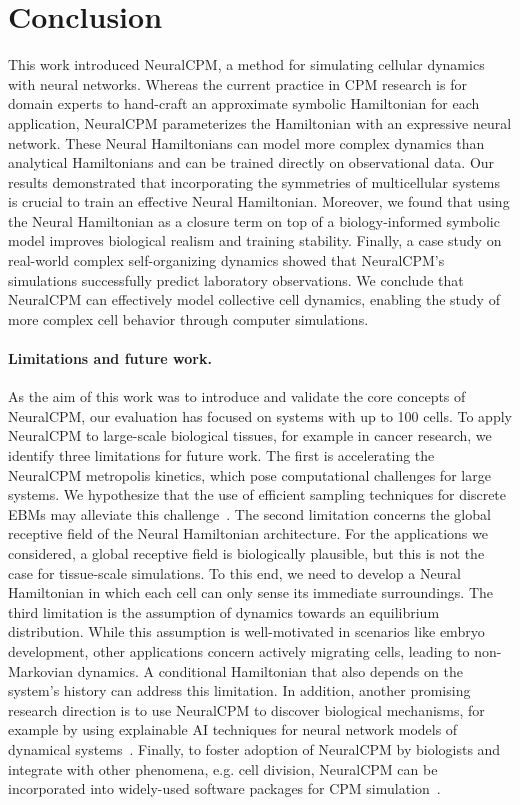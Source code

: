 \section{Conclusion}\label{sec:conclusion}

This work introduced NeuralCPM, a method for simulating cellular dynamics with neural networks. Whereas the current practice in CPM research is for domain experts to hand-craft an approximate symbolic Hamiltonian for each application, NeuralCPM parameterizes the Hamiltonian with an expressive neural network. These Neural Hamiltonians can model more complex dynamics than analytical Hamiltonians and can be trained directly on observational data. Our results demonstrated that incorporating the symmetries of multicellular systems is crucial to train an effective Neural Hamiltonian. Moreover, we found that using the Neural Hamiltonian as a closure term on top of a biology-informed symbolic model improves biological realism and training stability. Finally, a case study on real-world complex self-organizing dynamics showed that NeuralCPM's simulations successfully predict laboratory observations. We conclude that NeuralCPM can effectively model collective cell dynamics, enabling the study of more complex cell behavior through computer simulations.
\paragraph{Limitations and future work.}
As the aim of this work was to introduce and validate the core concepts of NeuralCPM, our evaluation has focused on systems with up to 100 cells. To apply NeuralCPM to large-scale biological tissues, for example in cancer research, we identify three limitations for future work. 
The first is accelerating the NeuralCPM metropolis kinetics, which pose computational challenges for large systems. We hypothesize that the use of efficient sampling techniques for discrete EBMs may alleviate this challenge~\cite{grathwohl2021oops, zhang2022langevin, sun2023discrete}.
The second limitation concerns the global receptive field of the Neural Hamiltonian architecture. For the applications we considered, a global receptive field is biologically plausible, but this is not the case for tissue-scale simulations. To this end, we need to develop a Neural Hamiltonian in which each cell can only sense its immediate surroundings. 
The third limitation is the assumption of dynamics towards an equilibrium distribution. While this assumption is well-motivated in scenarios like embryo development, other applications concern actively migrating cells, leading to non-Markovian dynamics. A conditional Hamiltonian that also depends on the system's history can address this limitation. 
In addition, another promising research direction is to use NeuralCPM to discover biological mechanisms, for example by using explainable AI techniques for neural network models of dynamical systems~\cite{cranmer2020gnnsymreg, Brunton2016sindy}.
Finally, to foster adoption of NeuralCPM by biologists and integrate with other phenomena, e.g. cell division, NeuralCPM can be incorporated into widely-used software packages for CPM simulation~\cite{starruss2014morpheus, CC3D}.




